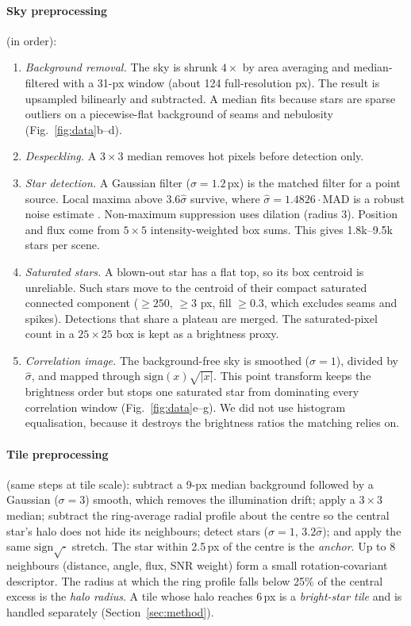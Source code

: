 \documentclass[a4paper,11pt]{article}
\begin{document}
\paragraph{Sky preprocessing} (in order):
\begin{enumerate}
\item \emph{Background removal.} The sky is shrunk $4\times$ by area averaging and median-filtered with a 31-px window
(about 124 full-resolution px). The result is upsampled bilinearly and subtracted. A median fits because stars are
sparse outliers on a piecewise-flat background of seams and nebulosity (Fig.~\ref{fig:data}b--d).
\item \emph{Despeckling.} A $3\times3$ median removes hot pixels before detection only.
\item \emph{Star detection.} A Gaussian filter ($\sigma=1.2$\,px) is the matched filter for a point source. Local maxima
above $3.6\hat\sigma$ survive, where $\hat\sigma = 1.4826\cdot\mathrm{MAD}$ is a robust noise estimate
\parencite{rousseeuw1993alternatives}. Non-maximum suppression uses dilation (radius 3). Position and flux come from
$5\times5$ intensity-weighted box sums. This gives 1.8k--9.5k stars per scene.
\item \emph{Saturated stars.} A blown-out star has a flat top, so its box centroid is unreliable. Such stars move to the
centroid of their compact saturated connected component ($\geq250$, $\geq3$ px, fill $\geq0.3$, which excludes seams
and spikes). Detections that share a plateau are merged. The saturated-pixel count in a $25\times25$ box is kept as a
brightness proxy.
\item \emph{Correlation image.} The background-free sky is smoothed ($\sigma=1$), divided by $\hat\sigma$, and mapped
through $\mathrm{sign}(x)\sqrt{|x|}$. This point transform keeps the brightness order but stops one saturated star from
dominating every correlation window (Fig.~\ref{fig:data}e--g). We did not use histogram equalisation, because it
destroys the brightness ratios the matching relies on.
\end{enumerate}

\paragraph{Tile preprocessing} (same steps at tile scale): subtract a 9-px median background followed by a Gaussian
($\sigma=3$) smooth, which removes the illumination drift; apply a $3\times3$ median; subtract the ring-average radial profile about the
centre so the central star's halo does not hide its neighbours; detect stars ($\sigma=1$, $3.2\hat\sigma$); and apply the
same $\mathrm{sign}\sqrt{\cdot}$ stretch. The star within 2.5\,px of the centre is the \emph{anchor}. Up to 8
neighbours (distance, angle, flux, SNR weight) form a small rotation-covariant descriptor. The radius at which the ring
profile falls below 25\% of the central excess is the \emph{halo radius}. A tile whose halo reaches 6\,px is a
\emph{bright-star tile} and is handled separately (Section~\ref{sec:method}).
\end{document}
